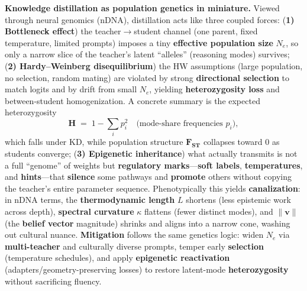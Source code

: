 \noindent
\textbf{Knowledge distillation as population genetics in miniature.}
Viewed through neural genomics (nDNA), distillation acts like three coupled forces:
(\textbf{1) Bottleneck effect}) the teacher$\to$student channel (one parent, fixed temperature, limited prompts) imposes a tiny \textbf{effective population size} \(N_e\), so only a narrow slice of the teacher’s latent “alleles” (reasoning modes) survives; 
(\textbf{2) Hardy--Weinberg disequilibrium}) the HW assumptions (large population, no selection, random mating) are violated by strong \textbf{directional selection} to match logits and by drift from small \(N_e\), yielding \textbf{heterozygosity loss} and between-student homogenization. A concrete summary is the expected heterozygosity
\[
\textbf{H} \;=\; 1 - \sum_i p_i^2 \quad\text{(mode-share frequencies \(p_i\))},
\]
which falls under KD, while population structure \(\textbf{F}_{\textbf{ST}}\) collapses toward 0 as students converge; 
(\textbf{3) Epigenetic inheritance}) what actually transmits is not a full “genome” of weights but \textbf{regulatory marks}—\textbf{soft labels}, \textbf{temperatures}, and \textbf{hints}—that \textbf{silence} some pathways and \textbf{promote} others without copying the teacher’s entire parameter sequence. 
Phenotypically this yields \textbf{canalization}: in nDNA terms, the \textbf{thermodynamic length} \(L\) shortens (less epistemic work across depth), \textbf{spectral curvature} \(\kappa\) flattens (fewer distinct modes), and \(\|\textbf{v}\|\) (the \textbf{belief vector} magnitude) shrinks and aligns into a narrow cone, washing out cultural nuance.
\textbf{Mitigation} follows the same genetics logic: widen \(N_e\) via \textbf{multi-teacher} and culturally diverse prompts, temper early \textbf{selection} (temperature schedules), and apply \textbf{epigenetic reactivation} (adapters/geometry-preserving losses) to restore latent-mode \textbf{heterozygosity} without sacrificing fluency.